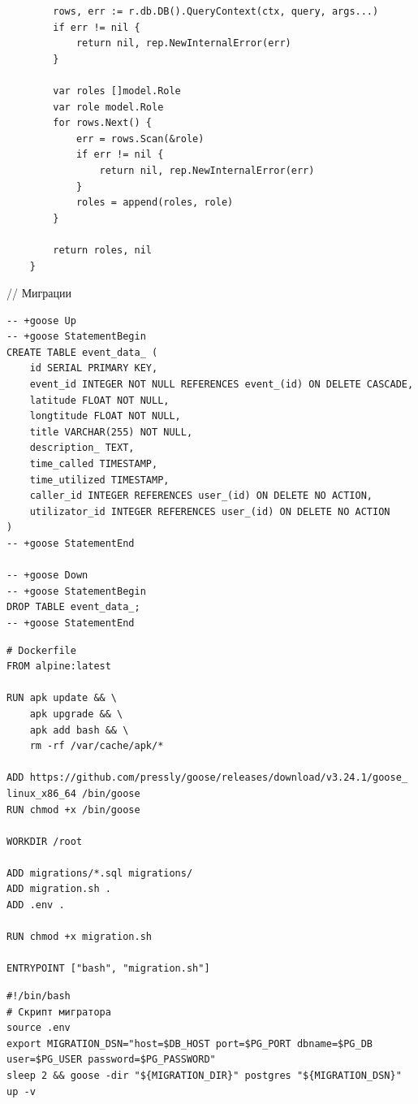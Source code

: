 \documentclass[diploma]{SCWorks}
\begin{document}
\begin{verbatim}
        rows, err := r.db.DB().QueryContext(ctx, query, args...)
        if err != nil {
            return nil, rep.NewInternalError(err)
        }

        var roles []model.Role
        var role model.Role
        for rows.Next() {
            err = rows.Scan(&role)
            if err != nil {
                return nil, rep.NewInternalError(err)
            }
            roles = append(roles, role)
        }

        return roles, nil
    }
\end{verbatim}
    // Миграции
\begin{verbatim}
-- +goose Up
-- +goose StatementBegin
CREATE TABLE event_data_ (
    id SERIAL PRIMARY KEY,
    event_id INTEGER NOT NULL REFERENCES event_(id) ON DELETE CASCADE,
    latitude FLOAT NOT NULL,
    longtitude FLOAT NOT NULL,
    title VARCHAR(255) NOT NULL,
    description_ TEXT,
    time_called TIMESTAMP,
    time_utilized TIMESTAMP,
    caller_id INTEGER REFERENCES user_(id) ON DELETE NO ACTION,
    utilizator_id INTEGER REFERENCES user_(id) ON DELETE NO ACTION
)
-- +goose StatementEnd

-- +goose Down
-- +goose StatementBegin
DROP TABLE event_data_;
-- +goose StatementEnd
\end{verbatim}

\begin{verbatim}
# Dockerfile
FROM alpine:latest

RUN apk update && \
    apk upgrade && \
    apk add bash && \
    rm -rf /var/cache/apk/*

ADD https://github.com/pressly/goose/releases/download/v3.24.1/goose_
linux_x86_64 /bin/goose
RUN chmod +x /bin/goose

WORKDIR /root

ADD migrations/*.sql migrations/
ADD migration.sh .
ADD .env .

RUN chmod +x migration.sh

ENTRYPOINT ["bash", "migration.sh"]
\end{verbatim}
        
\begin{verbatim}
#!/bin/bash
# Скрипт мигратора
source .env
export MIGRATION_DSN="host=$DB_HOST port=$PG_PORT dbname=$PG_DB user=$PG_USER password=$PG_PASSWORD"
sleep 2 && goose -dir "${MIGRATION_DIR}" postgres "${MIGRATION_DSN}" up -v
\end{verbatim}
        
\end{document}
